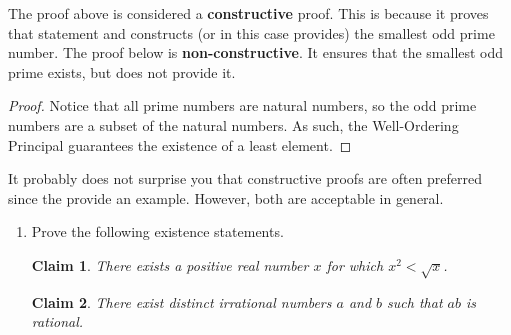 \documentclass[12 pt]{article}
\theoremstyle{definition}
\theoremstyle{plain}
\theoremstyle{mytheorem}
\theoremstyle{myexample}
\newtheorem{claim}{Claim}
\theoremstyle{mydefinition}
\begin{document}
The proof above is considered a \textbf{constructive} proof.  This is because it proves that statement and constructs (or in this case provides) the smallest odd prime number.  The proof below is \textbf{non-constructive}.  It ensures that the smallest odd prime exists, but does not provide it.

\begin{proof}  Notice that all prime numbers are natural numbers, so the odd prime numbers are a subset of the natural numbers.  As such, the Well-Ordering Principal guarantees the existence of a least element.
\end{proof}

It probably does not surprise you that constructive proofs are often preferred since the provide an example.  However, both are acceptable in general.

\begin{enumerate}[resume]

\item Prove the following existence statements.

\begin{claim}  There exists a positive real number $x$ for which $x^2 < \sqrt{x}$.
\end{claim}
\vspace{4in}

\begin{claim}  There exist distinct irrational numbers $a$ and $b$ such that $ab$ is rational.
\end{claim}
\end{enumerate}
\end{document}
